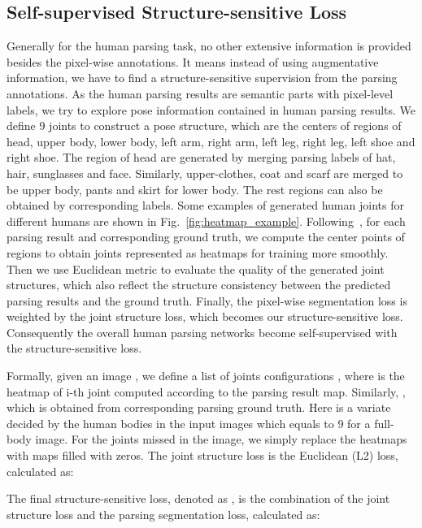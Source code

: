 \documentclass[10pt,twocolumn,letterpaper]{article}
\begin{document}
\subsection{Self-supervised Structure-sensitive Loss}
Generally for the human parsing task, no other extensive information is provided besides the pixel-wise annotations. It means instead of using augmentative information, we have to find a structure-sensitive supervision from the parsing annotations. As the human parsing results are semantic parts with pixel-level labels, we try to explore pose information contained in human parsing results. We define 9 joints to construct a pose structure, which are the centers of regions of head, upper body, lower body, left arm, right arm, left leg, right leg, left shoe and right shoe. The region of head are generated by merging parsing labels of hat, hair, sunglasses and face. Similarly, upper-clothes, coat and scarf are merged to be upper body, pants and skirt for lower body. The rest regions can also be obtained by corresponding labels. Some examples of generated human joints for different humans are shown in Fig.~\ref{fig:heatmap_example}. Following~\cite{Pfister15a}, for each parsing result and corresponding ground truth, we compute the center points of regions to obtain joints represented as heatmaps for training more smoothly. Then we use Euclidean metric to evaluate the quality of the generated joint structures, which also reflect the structure consistency between the predicted parsing results and the ground truth. Finally, the pixel-wise segmentation loss is weighted by the joint structure loss, which becomes our structure-sensitive loss. Consequently the overall human parsing networks become self-supervised with the structure-sensitive loss. 

Formally, given an image , we define a list of joints configurations , where  is the heatmap of i-th joint computed according to the parsing result map. Similarly, , which is obtained from corresponding parsing ground truth. Here  is a variate decided by the human bodies in the input images which equals to 9 for a full-body image. For the joints missed in the image, we simply replace the heatmaps with maps filled with zeros. The joint structure loss is the Euclidean (L2) loss, calculated as:
\vspace{-4mm}

\vspace{-1mm}
The final structure-sensitive loss, denoted as , is the combination of the joint structure loss and the parsing segmentation loss, calculated as:
\vspace{-1mm}
\end{document}
